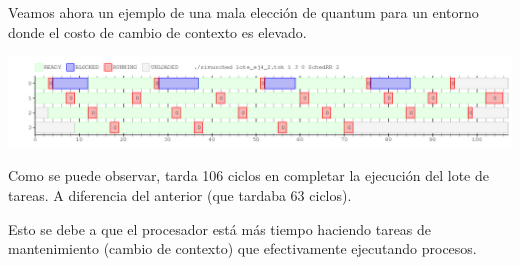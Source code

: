 Veamos ahora un ejemplo de una mala elección de quantum para un entorno donde el
costo de cambio de contexto es elevado.

\begin{center}
 \includegraphics[scale=0.48]{./RR/RR_example_3.png}
\end{center}

Como se puede observar, tarda 106 ciclos en completar la ejecución del lote de tareas.
A diferencia del anterior (que tardaba 63 ciclos).

Esto se debe a que el procesador está más tiempo haciendo tareas de mantenimiento (cambio de contexto)
que efectivamente ejecutando procesos.